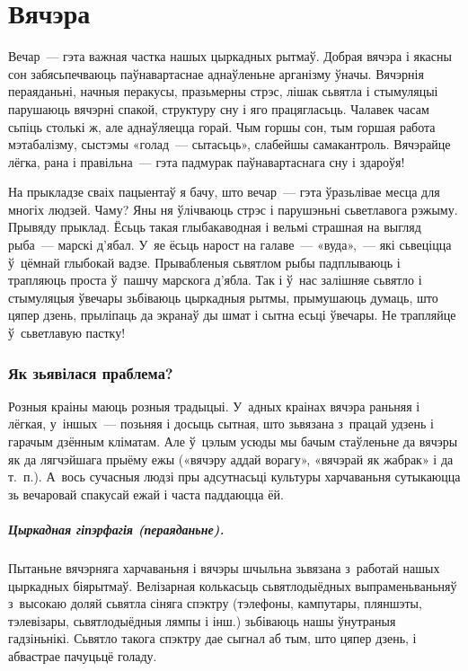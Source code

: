 \chapter{Вячэра}

Вечар~--- гэта важная частка нашых цыркадных рытмаў. Добрая вячэра і якасны сон забясьпечваюць паўнавартаснае аднаўленьне арганізму ўначы. Вячэрнія пераяданьні, начныя перакусы, празьмерны стрэс, лішак сьвятла і стымуляцыі парушаюць вячэрні спакой, структуру сну і яго працягласьць. Чалавек часам сьпіць столькі ж, але аднаўляецца горай. Чым горшы сон, тым горшая работа мэтабалізму, сыстэмы «голад~--- сытасьць», слабейшы самакантроль. Вячэрайце лёгка, рана і правільна~--- гэта падмурак паўнавартаснага сну і здароўя!

На прыкладзе сваіх пацыентаў я бачу, што вечар~--- гэта ўразьлівае месца для многіх людзей. Чаму? Яны ня ўлічваюць стрэс і парушэньні сьветлавога рэжыму. Прывяду прыклад. Ёсьць такая глыбакаводная і вельмі страшная на выгляд рыба~--- марскі д'ябал. У~яе ёсьць нарост на галаве~--- «вуда»,~--- які сьвеціцца ў~цёмнай глыбокай вадзе. Прывабленыя сьвятлом рыбы падплываюць і трапляюць проста ў~пашчу марскога д'ябла. Так і ў~нас залішняе сьвятло і стымуляцыя ўвечары зьбіваюць цыркадныя рытмы, прымушаюць думаць, што цяпер дзень, прыліпаць да экранаў ды шмат і сытна есьці ўвечары. Не трапляйце ў~сьветлавую пастку!

\subsection{Як зьявілася праблема?}

Розныя краіны маюць розныя традыцыі. У~адных краінах вячэра раньняя і лёгкая, у~іншых~--- позьняя і досыць сытная, што зьвязана з~працай удзень і гарачым дзённым кліматам. Але ў~цэлым усюды мы бачым стаўленьне да вячэры як да лягчэйшага прыёму ежы («вячэру аддай ворагу», «вячэрай як жабрак» і да т.~п.). А~вось сучасныя людзі пры адсутнасьці культуры харчаваньня сутыкаюцца зь вечаровай спакусай ежай і часта паддаюцца ёй.


\paragraph{Цыркадная гіпэрфагія (пераяданьне).}
Пытаньне вячэрняга харчаваньня і вячэры шчыльна зьвязана з~работай нашых цыркадных біярытмаў. Велізарная колькасьць сьвятлодыёдных выпраменьваньняў з~высокаю доляй сьвятла сіняга спэктру (тэлефоны, кампутары, пляншэты, тэлевізары, сьвятлодыёдныя лямпы і інш.) зьбіваюць нашы ўнутраныя гадзіньнікі. Сьвятло такога спэктру дае сыгнал аб тым, што цяпер дзень, і абвастрае пачуцьцё голаду.

